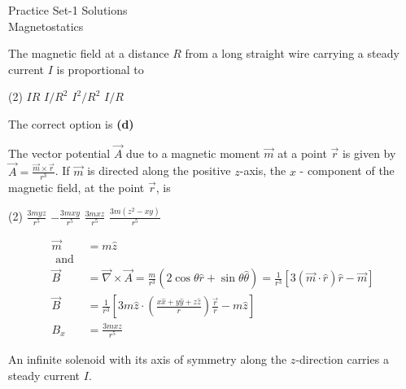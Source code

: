 
\begin{abox}
	Practice Set-1 Solutions\\\vspace{0.2cm}
	Magnetostatics
	\end{abox}
\begin{enumerate}
\begin{minipage}{\textwidth}
	\item The magnetic field at a distance $R$ from a long straight wire carrying a steady current $I$ is proportional to
\end{minipage}
\begin{tasks}(2)
	\task[\textbf{A.}] $I R$
	\task[\textbf{B.}] $I / R^{2}$
	\task[\textbf{C.}]$I^{2} / R^{2}$
	\task[\textbf{D.}]$I / R$
\end{tasks}
\begin{answer}
	The correct option is \textbf{(d)}	
\end{answer}
\begin{minipage}{\textwidth}
	\item The vector potential $\vec{A}$ due to a magnetic moment $\vec{m}$ at a point $\vec{r}$ is given by $\vec{A}=\frac{\vec{m} \times \vec{r}}{r^{3}}$.
	If $\vec{m}$ is directed along the positive $z$-axis, the $x$ - component of the magnetic field, at the point $\vec{r}$, is
\end{minipage}
\begin{tasks}(2)
	\task[\textbf{A.}] $\frac{3 m y z}{r^{5}}$
	\task[\textbf{B.}] $-\frac{3 m x y}{r^{5}}$
	\task[\textbf{C.}]$\frac{3 m x z}{r^{5}}$
	\task[\textbf{D.}]$\frac{3 m\left(z^{2}-x y\right)}{r^{5}}$
\end{tasks}
\begin{answer}
	\begin{align*}
	\vec{m}&=m \hat{z}\\
	 \text { and }\\
	 \vec{B}&=\vec{\nabla} \times \vec{A}=\frac{m}{r^{3}}(2 \cos \theta \hat{r}+\sin \theta \hat{\theta})=\frac{1}{r^{3}}[3(\vec{m} \cdot \hat{r}) \hat{r}-\vec{m}] \\
 \vec{B}&=\frac{1}{r^{3}}\left[3 m \hat{z} \cdot\left(\frac{x \hat{x}+y \hat{y}+z \hat{z}}{r}\right) \frac{\vec{r}}{r}-m \hat{z}\right] \\
   B_{x}&=\frac{3 m x z}{r^{5}}
	\end{align*}
\end{answer}
\begin{minipage}{\textwidth}
	\item An infinite solenoid with its axis of symmetry along the $z$-direction carries a steady current $I$.

\end{minipage}
\end{enumerate}
